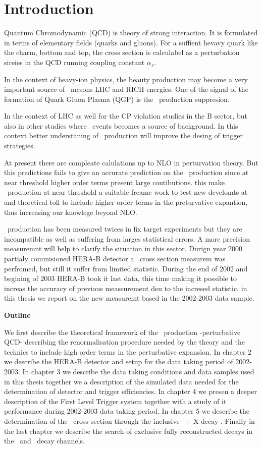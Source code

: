 \chapter*{Introduction}

Quantum Chromodynamic (QCD) is theory of strong interaction. It is formulated in terms of elementary fields (quarks and gluons). For a suffient hevavy quark like the charm, bottom and top, the cross section is calculabel as a perturbation sireies in the QCD running coupling constant $\alpha_s$. 

In the context of heavy-ion physics, the beauty production may become a very important source of \jpsi\ mesons LHC and RICH energies. One of the signal of the formation of Quark Gluon Plasma (QGP) is the \jpsi\ production suppresion. 

In the context of LHC  as well for the CP violation studies in the B sector, but also in other studies where \bbbar\ events becomes a source of background. In this context better understaning of \bbbar\ production will improve the desing of trigger strategies. 

At present there are compleate calulations up to NLO in perturvation theory. But this predictions fails to give an accurate prediction on the \bbbar\ production since at near threshold higher order terms present large contibutions. this make \bbbar\ production at near threshold a suitable freame work to test new develomts at and thoretical toll to include higher order terms in the preturvative expantion, thus increasing our knowlege beyond NLO. 

\bbbar\ production has been measured twices in fix target experiments but they are incompatible as well as suffering from larges statistical errors. A more precision measuremnt will help to clarify the situation in this sector. Durign year 2000 partialy commisioned HERA-B detector a \bbbar\ cross section measurem was perfromed, but still it suffer from limited statistic. During the end of 2002 and begining of 2003 HERA-B took it last data, this time making it possible to increas the accuracy of previous meassurement deu to the incresed statistic. in this thesis we report on the new measuremt based in the 2002-2003 data sample.


{\bf Outline }

We first describe the theoretical framework  of the \bbbar\ production -perturbative QCD- describing the renormalisation procedure needed by the theory and the technics to include high order terms in the perturbative expansion. In chapter 2 we describe the HERA-B detector and setup for the data taking period of 2002-2003. In chapter 3 we describe the data taking conditions and data samples used in this thesis together we a description of the simulated data needed for the determination of detector and trigger efficiencies. 
In chapter 4 we presen a deeper description of the First Level Trigger system together with a study of it performance during 2002-2003 data taking period. 
In chapter 5 we describe the determination of the \bbbar\ cross section through the inclusive \btojpsi\ + X decay . Finally in the last chapter we describe the search of exclusive fully reconstructed decays in the \bjk\ and \bjkp\ decay channels.  